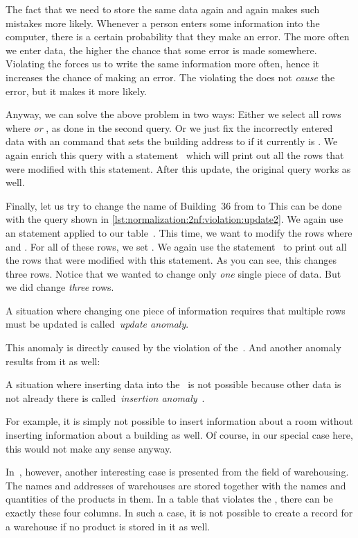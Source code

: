 The fact that we need to store the same data again and again makes such mistakes more likely.
Whenever a person enters some information into the computer, there is a certain probability that they make an error.
The more often we enter data, the higher the chance that some error is made somewhere.
Violating the  forces us to write the same information more often, hence it increases the chance of making an error.
The violating the  does not \emph{cause} the error, but it makes it more likely.%
%
\begin{sloppypar}%
Anyway, we can solve the above problem in two ways:
Either we select all rows where  \emph{or} , as done in the second query.
Or we just fix the incorrectly entered data with an  command that sets the building address to  if it currently is .
We again enrich this query with a  statement~\cite{PGDG:PD:RDFMR} which will print out all the rows that were modified with this statement.
After this update, the original query works as well.%
\end{sloppypar}%
%
Finally, let us try to change the name of Building~36 from  to 
This can be done with the query shown in \cref{lst:normalization:2nf:violation:update2}.
We again use an  statement applied to our table~.
This time, we want to modify the rows where  and .
For all of these rows, we set .
We again use the  statement~\cite{PGDG:PD:RDFMR} to print out all the rows that were modified with this statement.
As you can see, this changes three rows.
Notice that we wanted to change only \emph{one} single piece of data.
But we did change \emph{three} rows.%
%
\begin{definition}%
A situation where changing one piece of information requires that multiple rows must be updated is called~\emph{update anomaly}.%
\end{definition}%
%
This anomaly is directly caused by the violation of the~.
And another anomaly results from it as well:%
%
\begin{definition}%
A situation where inserting data into the \db\ is not possible because other data is not already there is called~\emph{insertion anomaly}~\cite{S2024D:RNDAFDNF}.%
\end{definition}%
%
For example, it is simply not possible to insert information about a room without inserting information about a building as well.
Of course, in our special case here, this would not make any sense anyway.

In~\cite{K1983ASGTFNFIRDT}, however, another interesting case is presented from the field of warehousing.
The names and addresses of warehouses are stored together with the names and quantities of the products in them.
In a table that violates the , there can be exactly these four columns.
In such a case, it is not possible to create a record for a warehouse if no product is stored in it as well.%
%
\FloatBarrier%
\endhsection%
%
